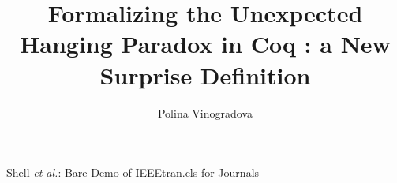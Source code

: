 \documentclass[journal]{journal}
\begin{document}
%
\title{Formalizing the Unexpected Hanging Paradox in Coq : a New Surprise Definition}
%
%
%

\author{Polina Vinogradova}%

%
%



%
{Shell \MakeLowercase{\textit{et al.}}: Bare Demo of IEEEtran.cls for Journals}
%




\end{document}
